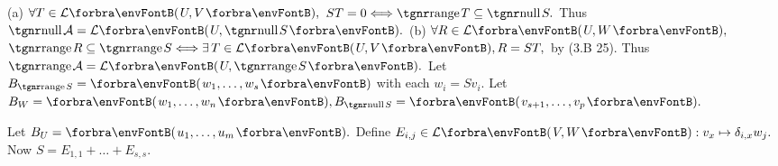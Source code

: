 (a) $\forall T\in\Lm{U,V},$ $ST=0\Longleftrightarrow\range T\subseteq\null S.$ Thus $\null\mA=\Lm{U,\null S}.$\parSol{\vspace{2pt}}
(b) $\forall R\in\Lm{U,W},$ $\range R\subseteq\range S \Longleftrightarrow\exists\,T\in\Lm{U,V},R=ST,$ by (3.B 25).\parSol{\Hb}
Thus $\range\mA=\Lm{U,\range S}.$\PfEnd\vspace{4pt}\quad
\Or Let $B_{\range S}=\Par{w_1,\dots,w_s}$ with each $w_i=Sv_i.$ Let $B_W=\Par{w_1,\dots,w_n},B_{\null S}=\Par{v_{s+1},\dots,v_p}.$\par\vspace{0pt}\quad
Let $B_U=\Par{u_1,\dots,u_m}.$ Define $E_{i,j}\in\Lm{V,W}:v_x\mapsto\delta_{i,x}w_j.$ Now $S=E_{1,1}+\dots+E_{s,s}.$\par\vspace{0pt}\quad%

